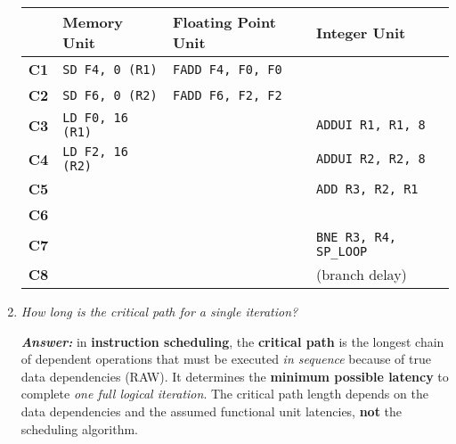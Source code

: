 \begin{enumerate}
\begin{center}
    \end{center}

    \begin{table}[!htp]
        \centering
        \begin{tabular}{@{} l | l | l | l @{}}
            \toprule
            & \textbf{Memory Unit} & \textbf{Floating Point Unit} & \textbf{Integer Unit} \\
            \midrule
            \textbf{C1}  & \texttt{SD F4, 0 (R1)} & \texttt{FADD F4, F0, F0} & \\ [.3em]
            \textbf{C2}  & \texttt{SD F6, 0 (R2)} & \texttt{FADD F6, F2, F2} & \\ [.3em]
            \textbf{C3}  & \texttt{LD F0, 16 (R1)} & & \texttt{ADDUI R1, R1, 8} \\ [.3em]
            \textbf{C4}  & \texttt{LD F2, 16 (R2)} & & \texttt{ADDUI R2, R2, 8} \\ [.3em]
            \textbf{C5}  & & & \texttt{ADD R3, R2, R1} \\ [.3em]
            \textbf{C6}  & & & \\ [.3em]
            \textbf{C7}  & & & \texttt{BNE R3, R4, SP\_LOOP} \\ [.3em]
            \textbf{C8}  & & & (branch delay) \\
            \bottomrule
        \end{tabular}
    \end{table}

    \newpage


    \item \emph{How long is the critical path for a single iteration?}

    \textcolor{Green3}{\textbf{\emph{Answer:}}} in \textbf{instruction scheduling}, the \textbf{critical path} is the longest chain of dependent operations that must be executed \emph{in sequence} because of true data dependencies (RAW). It determines the \textbf{minimum possible latency} to complete \emph{one full logical iteration}. The critical path length depends on the data dependencies and the assumed functional unit latencies, \textbf{not} the scheduling algorithm.


\end{enumerate}
